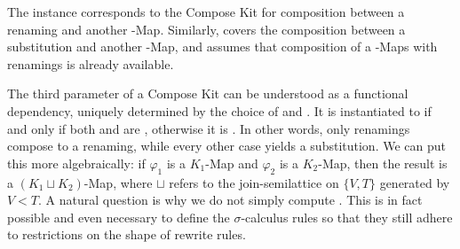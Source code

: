 \documentclass[screen,nonacm]{acmart}
\begin{document}
\noindent The  instance corresponds to the Compose Kit for composition
between a renaming and another -Map. Similarly,  covers the
composition between a substitution and another -Map, and assumes that
composition of a -Maps with renamings is already available.

The third parameter  of a Compose Kit can be understood as a
functional dependency, uniquely determined by the choice of  and
. It is instantiated to  if and only if both
 and  are , otherwise it is
. In other words, only renamings compose to a renaming, while
every other case yields a substitution. We can put this more algebraically: if
$\varphi_1$ is a $K_1$-Map and $\varphi_2$ is a $K_2$-Map, then the result is a
$(K_1 \sqcup K_2)$-Map, where $\sqcup$ refers to the join-semilattice on $\{V,
      T\}$ generated by $V < T$. A natural question is why we do not simply compute
. This is in fact possible and even necessary to define the
$σ$-calculus rules so that they still adhere to restrictions on the shape of
rewrite rules.
\end{document}
